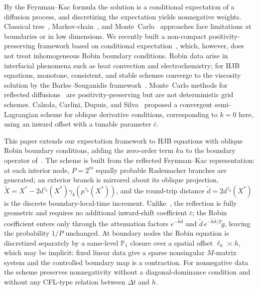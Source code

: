 \documentclass[11pt]{article}
\theoremstyle{definition}
\theoremstyle{remark}
\newcommand{\dt}{\Delta t}
\begin{document}
By the Feynman--Kac formula the solution is a conditional expectation of a
diffusion process, and discretizing the expectation yields nonnegative
weights. Classical tree~\cite{Duffy2006}, Markov-chain~\cite{KushnerDupuis2001}, and
Monte~Carlo~\cite{FahimTouziWarin2011,GuoZhangZhuo2015} approaches face
limitations at boundaries or in low dimensions.  We recently built a
non-compact positivity-preserving framework based on conditional
expectation~\cite{RenXuYue2024,XuRenYue2026,XuLiYue2026}, which, however, does
not treat inhomogeneous Robin boundary conditions.  Robin data arise in
interfacial phenomena such as heat convection and electrochemistry; for HJB
equations, monotone, consistent, and stable schemes converge to the viscosity
solution by the Barles--Souganidis framework~\cite{BarlesSouganidis1991}.
Monte~Carlo methods for reflected diffusions~\cite{LeimkuhlerEtAl2023,NystromOnskog2010,ZhouCai2016}
are positivity-preserving but are not deterministic grid schemes.  Calzola,
Carlini, Dupuis, and Silva~\cite{CalzolaEtAl2023} proposed a convergent
semi-Lagrangian scheme for oblique derivative conditions, corresponding to
$k=0$ here, using an inward offset with a tunable parameter $\bar c$.

This paper extends our expectation framework to HJB equations with oblique
Robin boundary conditions, adding the zero-order term $ku$ to the boundary
operator of~\cite{CalzolaEtAl2023}.  The scheme is built from the reflected
Feynman--Kac representation: at each interior node, $P=2^m$ equally probable
Rademacher branches are generated; an exterior branch is mirrored about its
oblique projection, $\widetilde X=X^*-2d^{\gamma_b}(X^*)\gamma_b(p^{\gamma_b}(X^*))$,
and the round-trip distance $\widetilde d=2d^{\gamma_b}(X^*)$ is the discrete
boundary-local-time increment.  Unlike~\cite{CalzolaEtAl2023}, the reflection
is fully geometric and requires no additional inward-shift coefficient
$\bar c$; the Robin coefficient enters only
through the attenuation factors $e^{-\widetilde k\widetilde d}$ and
$\widetilde d\,e^{-\widetilde k\widetilde d/2}\widetilde g$, leaving the
probability $1/P$ unchanged.  At boundary nodes the Robin equation is
discretized separately by a same-level $\mathbb P_1$ closure over a spatial
offset $\ell_h\asymp h$, which may be implicit: fixed linear data give a
sparse nonsingular $M$-matrix system and the controlled boundary map is a
contraction.  For nonnegative data the scheme preserves nonnegativity without
a diagonal-dominance condition and without any CFL-type relation between
$\dt$ and $h$.
\end{document}

